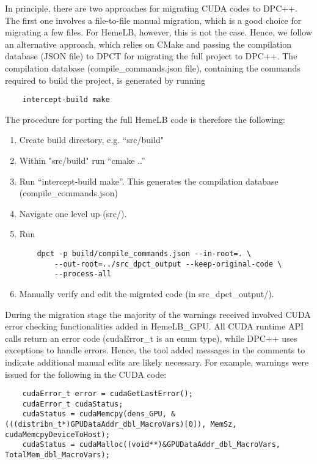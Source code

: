 \documentclass[../main]{subfiles}
\begin{document}
In principle, there are two approaches for migrating CUDA codes to DPC++. 
The first one involves a file-to-file manual migration, which is a good choice for migrating a few files.
For HemeLB, however, this is not the case. Hence, we follow an alternative approach, which relies on CMake and passing the compilation database (JSON file) to DPCT for migrating the full project to DPC++.    
The compilation database (compile\_commands.json file), containing the commands required to build the project, is generated by running 
\begin{verbatim}
    intercept-build make
\end{verbatim}

The procedure for porting the full HemeLB code is therefore the following: 
\begin{enumerate}
    \item Create build directory, e.g. ``src/build"
    \item Within "src/build" run ``cmake ..''
    \item Run ``intercept-build make''. This generates the compilation database (compile\_commands.json) 
    \item Navigate one level up (src/). 
    \item Run 
    \begin{verbatim}
    dpct -p build/compile_commands.json --in-root=. \
        --out-root=../src_dpct_output --keep-original-code \
        --process-all
    \end{verbatim}
    \item Manually verify and edit the migrated code (in src\_dpct\_output/).
\end{enumerate}

During the migration stage the majority of the warnings received involved CUDA error checking functionalities added in HemeLB\_GPU. 
All CUDA runtime API calls return an error code (cudaError\_t is an enum type), while DPC++ uses exceptions to handle errors. Hence, the tool added messages in the comments to indicate additional manual edits are likely necessary.
For example, warnings were issued for the following in the CUDA code:  
\begin{verbatim}
    cudaError_t error = cudaGetLastError();
    cudaError_t cudaStatus;
    cudaStatus = cudaMemcpy(dens_GPU, &(((distribn_t*)GPUDataAddr_dbl_MacroVars)[0]), MemSz, cudaMemcpyDeviceToHost);
    cudaStatus = cudaMalloc((void**)&GPUDataAddr_dbl_MacroVars, TotalMem_dbl_MacroVars);
\end{verbatim}
\end{document}
